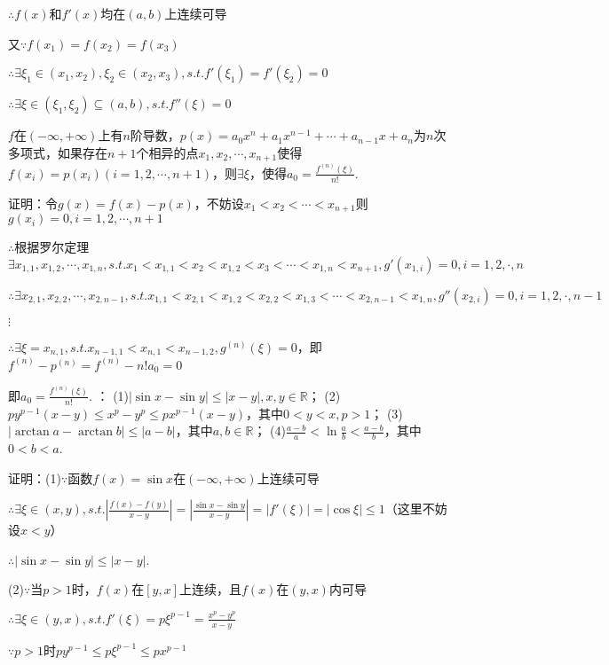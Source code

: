 \documentclass[12pt,UTF8]{ctexart}
\begin{document}
\begin{enumerate}
$\therefore f(x)$和$f'(x)$均在$(a,b)$上连续可导

又$\because f(x_1)=f(x_2)=f(x_3)$

$\therefore\exists\xi_1\in(x_1,x_2),\xi_2\in(x_2,x_3),s.t.f'(\xi_1)=f'(\xi_2)=0$

$\therefore\exists\xi\in(\xi_1,\xi_2)\subseteq(a,b),s.t.f''(\xi)=0$

$f$在$(-\infty,+\infty)$上有$n$阶导数，$p(x)=a_0x^n+a_1x^{n-1}+\cdots+a_{n-1}x+a_n$为$n$次多项式，如果存在$n+1$个相异的点$x_1,x_2,\cdots,x_{n+1}$使得$f(x_i)=p(x_i)(i=1,2,\cdots,n+1)$，则$\exists\xi$，使得$a_0=\frac{f^{(n)}(\xi)}{n!}$.

证明：令$g(x)=f(x)-p(x)$，不妨设$x_1<x_2<\cdots<x_{n+1}$则$g(x_i)=0,i=1,2,\cdots,n+1$

$\therefore$根据罗尔定理$\exists x_{1,1},x_{1,2},\cdots,x_{1,n},s.t.x_1<x_{1,1}<x_2<x_{1,2}<x_3<\cdots<x_{1,n}<x_{n+1},g'(x_{1,i})=0,i=1,2,\cdot,n$

$\therefore\exists x_{2,1},x_{2,2},\cdots,x_{2,n-1},s.t.x_{1,1}<x_{2,1}<x_{1,2}<x_{2,2}<x_{1,3}<\cdots<x_{2,n-1}<x_{1,n},g''(x_{2,i})=0,i=1,2,\cdot,n-1$

$\vdots$

$\therefore\exists\xi=x_{n,1},s.t.x_{n-1,1}<x_{n,1}<x_{n-1,2},g^{(n)}(\xi)=0$，即$f^{(n)}-p^{(n)}=f^{(n)}-n!a_0=0$

即$a_0=\frac{f^{(n)}(\xi)}{n!}$.
：
\newline
(1)$|\sin x-\sin y|\leq|x-y|,x,y\in\mathbb R$；
\newline
(2)$py^{p-1}(x-y)\leq x^p-y^p\leq px^{p-1}(x-y)$，其中$0<y<x,p>1$；
\newline
(3)$|\arctan a-\arctan b|\leq|a-b|$，其中$a,b\in\mathbb R$；
\newline
(4)$\frac{a-b}a<\ln\frac ab<\frac{a-b}b$，其中$0<b<a$.

证明：(1)$\because$函数$f(x)=\sin x$在$(-\infty,+\infty)$上连续可导

$\therefore\exists\xi\in(x,y),s.t.|\frac{f(x)-f(y)}{x-y}|=|\frac{\sin x-\sin y}{x-y}|=|f'(\xi)|=|\cos\xi|\leq1$（这里不妨设$x<y$）

$\therefore|\sin x-\sin y|\leq|x-y|$.

(2)$\because$当$p>1$时，$f(x)$在$[y,x]$上连续，且$f(x)$在$(y,x)$内可导

$\therefore\exists\xi\in(y,x),s.t.f'(\xi)=p\xi^{p-1}=\frac{x^p-y^p}{x-y}$

$\because p>1$时$py^{p-1}\leq p\xi^{p-1}\leq px^{p-1}$


\end{enumerate}
\end{document}
